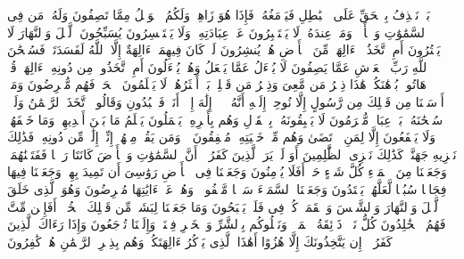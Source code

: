 \startbuffer[\q:21:18]
بَلۡ نَقۡذِفُ بِٱلۡحَقِّ عَلَى ٱلۡبَٰطِلِ فَیَدۡمَغُهُۥ فَإِذَا هُوَ زَاهِقࣱۚ وَلَكُمُ ٱلۡوَیۡلُ مِمَّا تَصِفُونَ%
\stopbuffer
\startbuffer[\q:21:19]
وَلَهُۥ مَن فِی ٱلسَّمَٰوَٰتِ وَٱلۡأَرۡضِۚ وَمَنۡ عِندَهُۥ لَا یَسۡتَكۡبِرُونَ عَنۡ عِبَادَتِهِۦ وَلَا یَسۡتَحۡسِرُونَ%
\stopbuffer
\startbuffer[\q:21:20]
یُسَبِّحُونَ ٱلَّیۡلَ وَٱلنَّهَارَ لَا یَفۡتُرُونَ%
\stopbuffer
\startbuffer[\q:21:21]
أَمِ ٱتَّخَذُوۤا۟ ءَالِهَةࣰ مِّنَ ٱلۡأَرۡضِ هُمۡ یُنشِرُونَ%
\stopbuffer
\startbuffer[\q:21:22]
لَوۡ كَانَ فِیهِمَاۤ ءَالِهَةٌ إِلَّا ٱللَّهُ لَفَسَدَتَاۚ فَسُبۡحَٰنَ ٱللَّهِ رَبِّ ٱلۡعَرۡشِ عَمَّا یَصِفُونَ%
\stopbuffer
\startbuffer[\q:21:23]
لَا یُسۡءَلُ عَمَّا یَفۡعَلُ وَهُمۡ یُسۡءَلُونَ%
\stopbuffer
\startbuffer[\q:21:24]
أَمِ ٱتَّخَذُوا۟ مِن دُونِهِۦۤ ءَالِهَةࣰۖ قُلۡ هَاتُوا۟ بُرۡهَٰنَكُمۡۖ هَٰذَا ذِكۡرُ مَن مَّعِیَ وَذِكۡرُ مَن قَبۡلِیۚ بَلۡ أَكۡثَرُهُمۡ لَا یَعۡلَمُونَ ٱلۡحَقَّۖ فَهُم مُّعۡرِضُونَ%
\stopbuffer
\startbuffer[\q:21:25]
وَمَاۤ أَرۡسَلۡنَا مِن قَبۡلِكَ مِن رَّسُولٍ إِلَّا نُوحِیۤ إِلَیۡهِ أَنَّهُۥ لَاۤ إِلَٰهَ إِلَّاۤ أَنَا۠ فَٱعۡبُدُونِ%
\stopbuffer
\startbuffer[\q:21:26]
وَقَالُوا۟ ٱتَّخَذَ ٱلرَّحۡمَٰنُ وَلَدࣰاۗ سُبۡحَٰنَهُۥۚ بَلۡ عِبَادࣱ مُّكۡرَمُونَ%
\stopbuffer
\startbuffer[\q:21:27]
لَا یَسۡبِقُونَهُۥ بِٱلۡقَوۡلِ وَهُم بِأَمۡرِهِۦ یَعۡمَلُونَ%
\stopbuffer
\startbuffer[\q:21:28]
یَعۡلَمُ مَا بَیۡنَ أَیۡدِیهِمۡ وَمَا خَلۡفَهُمۡ وَلَا یَشۡفَعُونَ إِلَّا لِمَنِ ٱرۡتَضَىٰ وَهُم مِّنۡ خَشۡیَتِهِۦ مُشۡفِقُونَ%
\stopbuffer
\startbuffer[\q:21:29]
۞ وَمَن یَقُلۡ مِنۡهُمۡ إِنِّیۤ إِلَٰهࣱ مِّن دُونِهِۦ فَذَٰلِكَ نَجۡزِیهِ جَهَنَّمَۚ كَذَٰلِكَ نَجۡزِی ٱلظَّٰلِمِینَ%
\stopbuffer
\startbuffer[\q:21:30]
أَوَ لَمۡ یَرَ ٱلَّذِینَ كَفَرُوۤا۟ أَنَّ ٱلسَّمَٰوَٰتِ وَٱلۡأَرۡضَ كَانَتَا رَتۡقࣰا فَفَتَقۡنَٰهُمَاۖ وَجَعَلۡنَا مِنَ ٱلۡمَاۤءِ كُلَّ شَیۡءٍ حَیٍّۚ أَفَلَا یُؤۡمِنُونَ%
\stopbuffer
\startbuffer[\q:21:31]
وَجَعَلۡنَا فِی ٱلۡأَرۡضِ رَوَٰسِیَ أَن تَمِیدَ بِهِمۡ وَجَعَلۡنَا فِیهَا فِجَاجࣰا سُبُلࣰا لَّعَلَّهُمۡ یَهۡتَدُونَ%
\stopbuffer
\startbuffer[\q:21:32]
وَجَعَلۡنَا ٱلسَّمَاۤءَ سَقۡفࣰا مَّحۡفُوظࣰاۖ وَهُمۡ عَنۡ ءَایَٰتِهَا مُعۡرِضُونَ%
\stopbuffer
\startbuffer[\q:21:33]
وَهُوَ ٱلَّذِی خَلَقَ ٱلَّیۡلَ وَٱلنَّهَارَ وَٱلشَّمۡسَ وَٱلۡقَمَرَۖ كُلࣱّ فِی فَلَكࣲ یَسۡبَحُونَ%
\stopbuffer
\startbuffer[\q:21:34]
وَمَا جَعَلۡنَا لِبَشَرࣲ مِّن قَبۡلِكَ ٱلۡخُلۡدَۖ أَفَإِی۟ن مِّتَّ فَهُمُ ٱلۡخَٰلِدُونَ%
\stopbuffer
\startbuffer[\q:21:35]
كُلُّ نَفۡسࣲ ذَاۤئِقَةُ ٱلۡمَوۡتِۗ وَنَبۡلُوكُم بِٱلشَّرِّ وَٱلۡخَیۡرِ فِتۡنَةࣰۖ وَإِلَیۡنَا تُرۡجَعُونَ%
\stopbuffer
\startbuffer[\q:21:36]
وَإِذَا رَءَاكَ ٱلَّذِینَ كَفَرُوۤا۟ إِن یَتَّخِذُونَكَ إِلَّا هُزُوًا أَهَٰذَا ٱلَّذِی یَذۡكُرُ ءَالِهَتَكُمۡ وَهُم بِذِكۡرِ ٱلرَّحۡمَٰنِ هُمۡ كَٰفِرُونَ%
